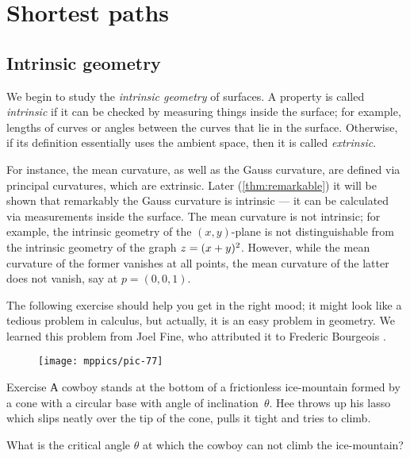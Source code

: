 \chapter{Shortest paths}
\label{chap:shortest}

\section{Intrinsic geometry}

We begin to study the \emph{intrinsic geometry} of surfaces.
A property is called \emph{intrinsic} if it can be checked by measuring things inside the surface; for example, lengths of curves or angles between the curves that lie in the surface.
Otherwise, if its definition essentially uses the ambient space, then it is called \emph{extrinsic}.

For instance, the mean curvature, as well as the Gauss curvature, are defined via principal curvatures, which are extrinsic.
Later (\ref{thm:remarkable}) it will be shown that remarkably the Gauss curvature is intrinsic --- it can be calculated via measurements inside the surface.
The mean curvature is not intrinsic; for example, the intrinsic geometry of the $(x,y)$-plane is not distinguishable from the intrinsic geometry of the graph $z\z=(x+y)^2$.
However, while the mean curvature of the former vanishes at all points, the mean curvature of the latter does not vanish, say at $p=(0,0,1)$.  

The following exercise should help you get in the right mood;
it might look like a tedious problem in calculus, but actually, it is an easy problem in geometry.
We learned this problem from Joel Fine, who attributed it to Frederic Bourgeois \cite{fine}.

\begin{wrapfigure}[6]{r}{33 mm}
\vskip-6mm
\centering
\texttt{[image: mppics/pic-77]}
\vskip-0mm
\end{wrapfigure}

\begin{thm}{Exercise}\label{ex:lasso}
А cowboy stands at the bottom of a frictionless ice-mountain formed by a cone with a circular base with  angle  of inclination~$\theta$.
Hee throws up his lasso which slips neatly over the tip of the cone, pulls it tight and tries to climb.

What is the critical angle $\theta$ at which the cowboy can not climb the ice-mountain?
\end{thm}

